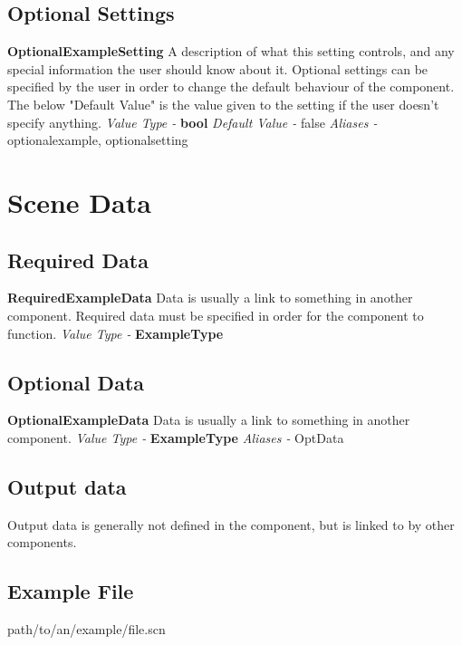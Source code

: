 \documentclass[a4paper,11pt]{article}
\newenvironment{componentoption}[1]%
{\textbf{#1}\newline}
{\newline}
\newcommand{\aliases}[1] {\newline \textit{Aliases - } #1}
\newcommand{\defaultvalue}[1] {\newline \textit{Default Value - } #1}
\newcommand{\valuetype}[1] {\newline \textit{Value Type - } \textbf{#1}}
\begin{document}
\subsection{Optional Settings}

\begin{componentoption}{OptionalExampleSetting}
A description of what this setting controls, and any special information the user should know about it. Optional settings can be specified by the user in order to change the default behaviour of the component. The below "Default Value" is the value given to the setting if the user doesn't specify anything.
\valuetype{bool}
\defaultvalue{false}
\aliases{optionalexample, optionalsetting}
\end{componentoption}

\section{Scene Data}

\subsection{Required Data}

\begin{componentoption}{RequiredExampleData}
Data is usually a link to something in another component. Required data must be specified in order for the component to function.
\valuetype{ExampleType}
\end{componentoption}

\subsection{Optional Data}

\begin{componentoption}{OptionalExampleData}
Data is usually a link to something in another component.
\valuetype{ExampleType}
\aliases{OptData}
\end{componentoption}

\subsection{Output data}
Output data is generally not defined in the component, but is linked to by other components.

\subsection{Example File}
path/to/an/example/file.scn
\end{document}
